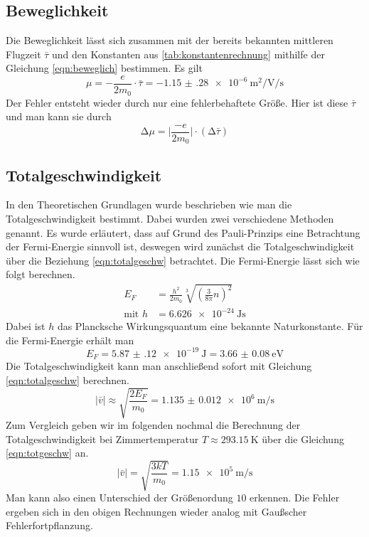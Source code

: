 \subsection{Beweglichkeit}
Die Beweglichkeit lässt sich zusammen mit der bereits bekannten mittleren Flugzeit $\bar{\tau}$ und den Konstanten aus \ref{tab:konstantenrechnung} mithilfe
der Gleichung \eqref{eqn:beweglich} bestimmen.
Es gilt
\begin{equation}
\mu = - \frac{e}{2 m_{0}} \cdot \bar{\tau} = \SI{-1.15(28)e-6}{\meter\squared\per\volt\per\second}
\end{equation}
Der Fehler entsteht wieder durch nur eine fehlerbehaftete Größe. Hier ist diese $\bar{\tau}$ und man kann sie durch
\begin{equation}
\increment \mu = \biggl| \frac{-e}{2m_{0}}\biggr| \cdot (\increment \bar{\tau})
\end{equation}

\subsection{Totalgeschwindigkeit}
In den Theoretischen Grundlagen wurde beschrieben wie man die Totalgeschwindigkeit bestimmt. Dabei wurden zwei verschiedene Methoden genannt. 
Es wurde erläutert, dass auf Grund des Pauli-Prinzips eine Betrachtung der Fermi-Energie sinnvoll ist, deswegen wird zunächst die Totalgeschwindigkeit über die Beziehung \eqref{eqn:totalgeschw}
betrachtet.
Die Fermi-Energie lässt sich wie folgt berechnen.
\begin{align}
E_{F} &= \frac{h^{2}}{2 m_{0}} \sqrt[3]{\left( \frac{3}{8\pi} n \right)^{2}} \\[0.5em]
\text{mit  } h &= \SI{6.626e-24}{\joule\second}
\end{align}
Dabei ist $h$ das Plancksche Wirkungsquantum eine bekannte Naturkonstante.
Für die Fermi-Energie erhält man
\begin{equation}
E_{F}= \SI{5.87(12)e-19}{\joule} = \SI{3.66(8)}{\electronvolt}
\end{equation}
Die Totalgeschwindigkeit kann man anschließend sofort mit Gleichung \eqref{eqn:totalgeschw} berechnen.
\begin{equation}
\lvert \bar{v} \rvert \approx \sqrt{\frac{2 E_{F}}{m_{0}}} = \SI{1.135(12)e6}{\meter\per\second}
\end{equation}
Zum Vergleich geben wir im folgenden nochmal die Berechnung der Totalgeschwindigkeit bei Zimmertemperatur $T \approx \SI{293.15}{\kelvin}$ über die 
Gleichung \eqref{eqn:totgeschw} an.
\begin{equation}
\lvert \bar{v} \rvert = \sqrt{\frac{3kT}{m_{0}}} = \SI{1.15e5}{\meter\per\second}
\end{equation}
Man kann also einen Unterschied der Größenordung $10$ erkennen.
Die Fehler ergeben sich in den obigen Rechnungen wieder analog mit Gaußscher Fehlerfortpflanzung.

